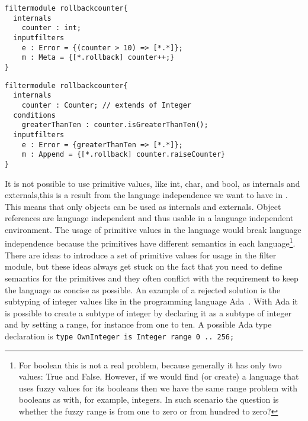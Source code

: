 \begin{lstlisting}[caption = {A hypothetical filter module with a primitive value}, label = lst::ARM:int:example3,
style = listing, language =ComposeStar, float = tpb]
filtermodule rollbackcounter{
  internals
    counter : int;
  inputfilters
    e : Error = {(counter > 10) => [*.*]};
    m : Meta = {[*.rollback] counter++;}
}  
\end{lstlisting}
\begin{lstlisting}[caption = {A filter module with an object instead of primitive value}, label = lst::ARM:int:example4,
style = listing, language =ComposeStar, float = tpb]
filtermodule rollbackcounter{
  internals
    counter : Counter; // extends of Integer
  conditions
    greaterThanTen : counter.isGreaterThanTen();
  inputfilters
    e : Error = {greaterThanTen => [*.*]};
    m : Append = {[*.rollback] counter.raiseCounter}
}
\end{lstlisting}
It is not possible to use primitive values, like int, char, and bool, as internals and externals,this is a result from the language independence we want to have in \Compose*. 
This means that only objects can be used as internals and externals.
Object references are language independent and thus usable in a language independent environment.
The usage of primitive values in the language would break language independence because the primitives have different semantics in each language\footnote{For boolean this is not a real problem, because generally it has only two values: True and False. However, if we would find (or create) a language that uses fuzzy values for its booleans then we have the same range problem with booleans as with, for example, integers. In such scenario the question is whether the fuzzy range is from one to zero or from hundred to zero?}.
There are ideas to introduce a set of primitive values for usage in the filter module, but these ideas always get stuck on the fact that you need to define semantics for the primitives and they often conflict with the requirement to keep the language as concise as possible.
An example of a rejected solution is the subtyping of integer values like in the programming language Ada~\cite{Ada95}. 
With Ada it is possible to create a subtype of integer by declaring it as a subtype of integer and by setting a range, for instance from one to ten.
A possible Ada type declaration is \lstinline|type OwnInteger is Integer range 0 .. 256;|

